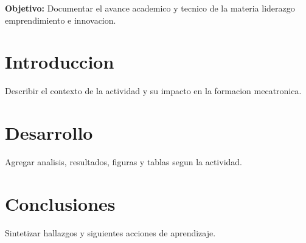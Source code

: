 \documentclass[spanish,letterpaper,oneside]{article}
\begin{document}
\templatePortrait
\templatePagecfg
\onehalfspacing

\begin{abstractd}
\textbf{Objetivo:} Documentar el avance academico y tecnico de la materia liderazgo emprendimiento e innovacion.
\end{abstractd}

\templateIndex
\templateFinalcfg

\section{Introduccion}
Describir el contexto de la actividad y su impacto en la formacion mecatronica.

\section{Desarrollo}
Agregar analisis, resultados, figuras y tablas segun la actividad.

\section{Conclusiones}
Sintetizar hallazgos y siguientes acciones de aprendizaje.



\end{document}

